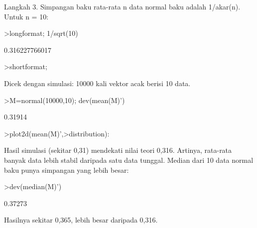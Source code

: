 \documentclass[a4paper,10pt]{article}
\begin{document}
\begin{eulernotebook}
\begin{eulercomment}
\begin{eulercomment}
\begin{eulercomment}
\begin{eulercomment}
\begin{eulercomment}
\begin{eulercomment}
\begin{eulercomment}
\begin{eulercomment}
\begin{eulercomment}
\begin{eulercomment}
\begin{eulercomment}
\begin{eulercomment}
\begin{eulercomment}
\begin{eulercomment}
\begin{eulercomment}
\begin{eulercomment}
\begin{eulercomment}
\begin{eulercomment}
\begin{eulercomment}
\begin{eulercomment}
\begin{eulercomment}
Langkah 3. Simpangan baku rata-rata n data normal baku adalah 1/akar(n). Untuk n = 10:
\end{eulercomment}
\begin{eulerprompt}
>longformat; 1/sqrt(10)
\end{eulerprompt}
\begin{euleroutput}
  0.316227766017
\end{euleroutput}
\begin{eulerprompt}
>shortformat;
\end{eulerprompt}
\begin{eulercomment}
Dicek dengan simulasi: 10000 kali vektor acak berisi 10 data.
\end{eulercomment}
\begin{eulerprompt}
>M=normal(10000,10); dev(mean(M)')
\end{eulerprompt}
\begin{euleroutput}
  0.31914
\end{euleroutput}
\begin{eulerprompt}
>plot2d(mean(M)',>distribution):
\end{eulerprompt}
\begin{eulercomment}
Hasil simulasi (sekitar 0,31) mendekati nilai teori 0,316. Artinya, rata-rata banyak data
lebih stabil daripada satu data tunggal. Median dari 10 data normal baku punya simpangan
yang lebih besar:
\end{eulercomment}
\begin{eulerprompt}
>dev(median(M)')
\end{eulerprompt}
\begin{euleroutput}
  0.37273
\end{euleroutput}
\begin{eulercomment}
Hasilnya sekitar 0,365, lebih besar daripada 0,316.


\end{eulercomment}
\end{eulercomment}
\end{eulercomment}
\end{eulercomment}
\end{eulercomment}
\end{eulercomment}
\end{eulercomment}
\end{eulercomment}
\end{eulercomment}
\end{eulercomment}
\end{eulercomment}
\end{eulercomment}
\end{eulercomment}
\end{eulercomment}
\end{eulercomment}
\end{eulercomment}
\end{eulercomment}
\end{eulercomment}
\end{eulercomment}
\end{eulercomment}
\end{eulercomment}
\end{eulernotebook}
\end{document}
